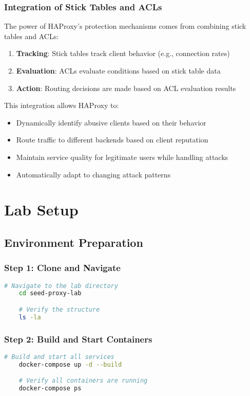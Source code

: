 \documentclass[12pt]{article}
\begin{document}
    \subsubsection{Integration of Stick Tables and ACLs}
    The power of HAProxy's protection mechanisms comes from combining stick tables and ACLs:

    \begin{enumerate}
        \item \textbf{Tracking}: Stick tables track client behavior (e.g., connection rates)
        \item \textbf{Evaluation}: ACLs evaluate conditions based on stick table data
        \item \textbf{Action}: Routing decisions are made based on ACL evaluation results
    \end{enumerate}

    This integration allows HAProxy to:
    \begin{itemize}
        \item Dynamically identify abusive clients based on their behavior
        \item Route traffic to different backends based on client reputation
        \item Maintain service quality for legitimate users while handling attacks
        \item Automatically adapt to changing attack patterns
    \end{itemize}

    \section{Lab Setup}

    \subsection{Environment Preparation}

    \subsubsection{Step 1: Clone and Navigate}
    \begin{lstlisting}[language=bash]
    # Navigate to the lab directory
    cd seed-proxy-lab

    # Verify the structure
    ls -la
    \end{lstlisting}

    \subsubsection{Step 2: Build and Start Containers}
    \begin{lstlisting}[language=bash]
    # Build and start all services
    docker-compose up -d --build

    # Verify all containers are running
    docker-compose ps
    \end{lstlisting}
\end{document}
